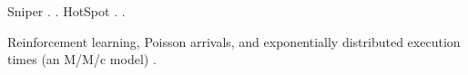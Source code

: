 Sniper \cite{carlson2011}.
 \cite{li2009}.
HotSpot \cite{skadron2004}.
 \cite{sridhar2010}.

Reinforcement learning, Poisson arrivals, and exponentially distributed
execution times (an M/M/c model) \cite{lu2015}.

